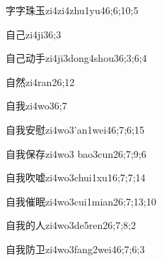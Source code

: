 \begin{verbete}{字字珠玉}{zi4zi4zhu1yu4}{6;6;10;5}
\end{verbete}

\begin{verbete}{自己}{zi4ji3}{6;3}
\end{verbete}

\begin{verbete}{自己动手}{zi4ji3dong4shou3}{6;3;6;4}
\end{verbete}

\begin{verbete}{自然}{zi4ran2}{6;12}
\end{verbete}

\begin{verbete}{自我}{zi4wo3}{6;7}
\end{verbete}

\begin{verbete}{自我安慰}{zi4wo3'an1wei4}{6;7;6;15}
\end{verbete}

\begin{verbete}{自我保存}{zi4wo3 bao3cun2}{6;7;9;6}
\end{verbete}

\begin{verbete}{自我吹嘘}{zi4wo3chui1xu1}{6;7;7;14}
\end{verbete}

\begin{verbete}{自我催眠}{zi4wo3cui1mian2}{6;7;13;10}
\end{verbete}

\begin{verbete}{自我的人}{zi4wo3de5ren2}{6;7;8;2}
\end{verbete}

\begin{verbete}{自我防卫}{zi4wo3fang2wei4}{6;7;6;3}
\end{verbete}

